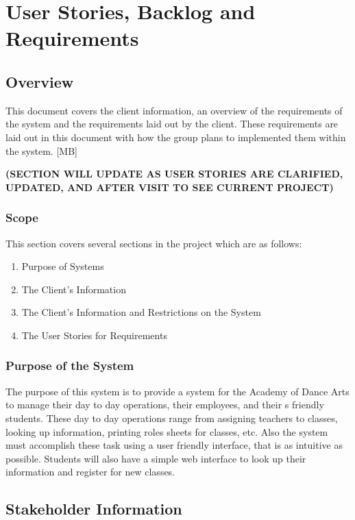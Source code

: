 \chapter{User Stories, Backlog and Requirements}
\section{Overview}

This document covers the client information, an overview of the requirements of the system and the requirements laid out by the client. These requirements are laid out in this document with how the group plans to implemented them within the system. [MB]

\bf(SECTION WILL UPDATE AS USER STORIES ARE CLARIFIED, UPDATED, AND AFTER VISIT TO SEE CURRENT PROJECT) 

\subsection{Scope}

This section covers several sections in the project which are as follows:
\begin{enumerate}
\item Purpose of Systems
\item The Client's Information
\item The Client's Information and Restrictions on the System
\item The User Stories for Requirements
\end{enumerate} 


\subsection{Purpose of the System}
The purpose of this system is to provide a system for the Academy of Dance Arts to manage their day to day operations, their employees, and their s friendly students. These day to day operations range from assigning teachers to classes, looking up information, printing roles sheets for classes, etc.  Also the system must accomplish these task using a user friendly interface, that is as intuitive as possible. Students will also have a simple web interface to look up their information and register for new classes.


\section{Stakeholder Information}

